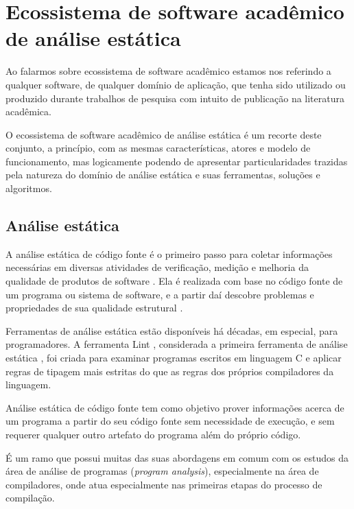 \section{Ecossistema de software acadêmico de análise estática} \label{analise-estatica}

Ao falarmos sobre ecossistema de software acadêmico estamos nos referindo a
qualquer software, de qualquer domínio de aplicação, que tenha sido utilizado
ou produzido durante trabalhos de pesquisa com intuito de publicação na
literatura acadêmica.

O ecossistema de software acadêmico de análise estática é um recorte deste
conjunto, a princípio, com as mesmas características, atores e modelo de
funcionamento, mas logicamente podendo de apresentar particularidades trazidas
pela natureza do domínio de análise estática e suas ferramentas, soluções e
algoritmos.

\subsection{Análise estática}

A análise estática de código fonte é o primeiro passo para coletar informações
necessárias em diversas atividades de verificação, medição e melhoria da
qualidade de produtos de software \cite{Cruz2009, Kirkov2010}. Ela é
realizada com base no código fonte de um programa ou sistema de software, e a
partir daí descobre problemas e propriedades de sua qualidade estrutural
\cite{Chess2007}.

Ferramentas de análise estática estão disponíveis há décadas, em especial,
para programadores. A ferramenta Lint \cite{Johnson1978}, considerada a
primeira ferramenta de análise estática \cite{Gosain2015}, foi criada para
examinar programas escritos em linguagem C e aplicar regras de tipagem mais
estritas do que as regras dos próprios compiladores da linguagem.

Análise estática de código fonte tem como objetivo prover
informações acerca de um programa a partir do seu código fonte sem
necessidade de execução, e sem requerer qualquer outro artefato do programa
além do próprio código.

É um ramo que possui muitas das suas abordagens em comum com os estudos da
área de análise de programas ({\it program analysis}), especialmente na área de
compiladores, onde atua especialmente nas primeiras etapas do processo de compilação.

